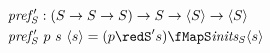 \documentclass[preview]{standalone}
\begin{document}
\begin{align*}%
    \mathit{pref'_S} &: (S \rightarrow S \rightarrow S) \rightarrow S \rightarrow \vect{S} \rightarrow \vect{S}\\
    \mathit{pref'_S} &\ p\ s\ \vect{s} = (p \redS' s) \fMapS \mathit{inits_S} \vect{s}%
\end{align*}
\end{document}
